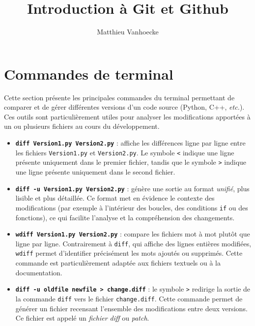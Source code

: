 \documentclass{article}
\title{Introduction à Git et Github}
\author{Matthieu Vanhoecke}
\begin{document}
\maketitle

\tableofcontents


\section{Commandes de terminal}

Cette section présente les principales commandes du terminal permettant de comparer et de gérer différentes versions d’un code source (Python, C++, \emph{etc.}). Ces outils sont particulièrement utiles pour analyser les modifications apportées à un ou plusieurs fichiers au cours du développement.

\begin{itemize}
    \item \textbf{\texttt{diff Version1.py Version2.py}} : affiche les différences ligne par ligne entre les fichiers \texttt{Version1.py} et \texttt{Version2.py}.  
    Le symbole \texttt{<} indique une ligne présente uniquement dans le premier fichier, tandis que le symbole \texttt{>} indique une ligne présente uniquement dans le second fichier.

    \item \textbf{\texttt{diff -u Version1.py Version2.py}} : génère une sortie au format \emph{unifié}, plus lisible et plus détaillée.  
    Ce format met en évidence le contexte des modifications (par exemple à l’intérieur des boucles, des conditions \texttt{if} ou des fonctions), ce qui facilite l’analyse et la compréhension des changements.

    \item \textbf{\texttt{wdiff Version1.py Version2.py}} : compare les fichiers mot à mot plutôt que ligne par ligne.  
    Contrairement à \texttt{diff}, qui affiche des lignes entières modifiées, \texttt{wdiff} permet d’identifier précisément les mots ajoutés ou supprimés. Cette commande est particulièrement adaptée aux fichiers textuels ou à la documentation.

    \item \textbf{\texttt{diff -u oldfile newfile > change.diff}} : le symbole \texttt{>} redirige la sortie de la commande \texttt{diff} vers le fichier \texttt{change.diff}.  
    Cette commande permet de générer un fichier recensant l’ensemble des modifications entre deux versions. Ce fichier est appelé un \emph{fichier diff} ou \emph{patch}.


\end{itemize}
\end{document}
